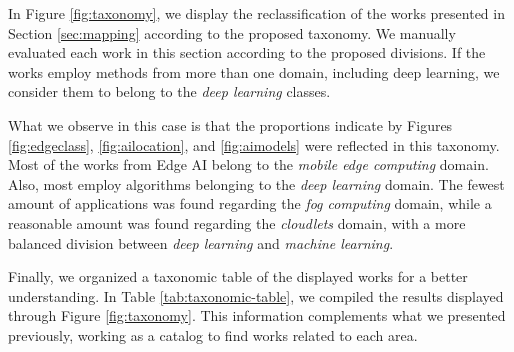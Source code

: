 In Figure \ref{fig:taxonomy}, we display the reclassification of the works presented in Section \ref{sec:mapping} according to the proposed taxonomy. We manually evaluated each work in this section according to the proposed divisions. If the works employ methods from more than one domain, including deep learning, we consider them to belong to the \textit{deep learning} classes.

What we observe in this case is that the proportions indicate by Figures \ref{fig:edgeclass}, \ref{fig:ailocation}, and \ref{fig:aimodels} were reflected in this taxonomy. Most of the works from Edge AI belong to the \textit{mobile edge computing} domain. Also, most employ algorithms belonging to the \textit{deep learning} domain. The fewest amount of applications was found regarding the \textit{fog computing} domain, while a reasonable amount was found regarding the \textit{cloudlets} domain, with a more balanced division between \textit{deep learning} and \textit{machine learning}.

Finally, we organized a taxonomic table of the displayed works for a better understanding. In Table \ref{tab:taxonomic-table}, we compiled the results displayed through Figure \ref{fig:taxonomy}. This information complements what we presented previously, working as a catalog to find works related to each area.


